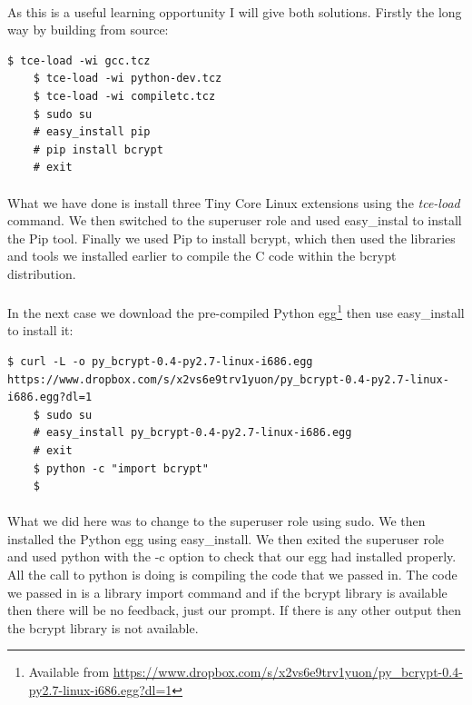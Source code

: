 \documentclass[12pt, a4paper, twoside]{book}
\begin{document}
\paragraph{} As this is a useful learning opportunity I will give both solutions. Firstly the long way by building from source:

\begin{lstlisting}[style=DOS]
    $ tce-load -wi gcc.tcz
    $ tce-load -wi python-dev.tcz
    $ tce-load -wi compiletc.tcz
    $ sudo su
    # easy_install pip
    # pip install bcrypt
    # exit 
\end{lstlisting}

\paragraph{} What we have done is install three Tiny Core Linux extensions using the \emph{tce-load} command. We then switched to the superuser role and used easy\_instal to install the Pip tool. Finally we used Pip to install bcrypt, which then used the libraries and tools we installed earlier to compile the C code within the bcrypt distribution.

\paragraph{} In the next case we download the pre-compiled Python egg\footnote{Available from \url{https://www.dropbox.com/s/x2vs6e9trv1yuon/py_bcrypt-0.4-py2.7-linux-i686.egg?dl=1}} then use easy\_install to install it:

\begin{lstlisting}[style=DOS]
    $ curl -L -o py_bcrypt-0.4-py2.7-linux-i686.egg https://www.dropbox.com/s/x2vs6e9trv1yuon/py_bcrypt-0.4-py2.7-linux-i686.egg?dl=1
    $ sudo su
    # easy_install py_bcrypt-0.4-py2.7-linux-i686.egg
    # exit
    $ python -c "import bcrypt"
    $
\end{lstlisting}

\paragraph{} What we did here was to change to the superuser role using sudo. We then installed the Python egg using easy\_install. We then exited the superuser role and used python with the -c option to check that our egg had installed properly. All the call to python is doing is compiling the code that we passed in. The code we passed in is a library import command and if the bcrypt library is available then there will be no feedback, just our prompt. If there is any other output then the bcrypt library is not available.
\end{document}
